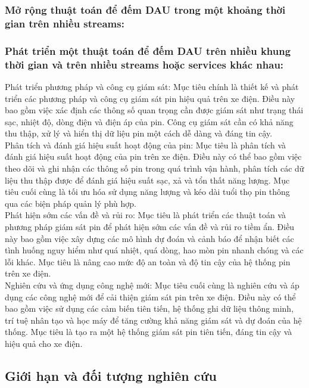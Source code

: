 \documentclass[a4paper,13pt]{article}
\theoremstyle{mytheor}
\begin{document}
\subsubsection{Mở rộng thuật toán để đếm DAU trong một khoảng thời gian trên nhiều streams:}
\subsubsection{Phát triển một thuật toán để đếm DAU trên nhiều khung thời gian và trên nhiều streams hoặc services khác nhau:}
Phát triển phương pháp và công cụ giám sát: Mục tiêu chính là thiết kế và phát triển các phương pháp và công cụ giám sát pin hiệu quả trên xe điện. Điều này bao gồm việc xác định các thông số quan trọng cần được giám sát như trạng thái sạc, nhiệt độ, dòng điện và điện áp của pin. Công cụ giám sát cần có khả năng thu thập, xử lý và hiển thị dữ liệu pin một cách dễ dàng và đáng tin cậy.\\
Phân tích và đánh giá hiệu suất hoạt động của pin: Mục tiêu là phân tích và đánh giá hiệu suất hoạt động của pin trên xe điện. Điều này có thể bao gồm việc theo dõi và ghi nhận các thông số pin trong quá trình vận hành, phân tích các dữ liệu thu thập được để đánh giá hiệu suất sạc, xả và tổn thất năng lượng. Mục tiêu cuối cùng là tối ưu hóa sử dụng năng lượng và kéo dài tuổi thọ pin thông qua các biện pháp quản lý phù hợp.\\
Phát hiện sớm các vấn đề và rủi ro: Mục tiêu là phát triển các thuật toán và phương pháp giám sát pin để phát hiện sớm các vấn đề và rủi ro tiềm ẩn. Điều này bao gồm việc xây dựng các mô hình dự đoán và cảnh báo để nhận biết các tình huống nguy hiểm như quá nhiệt, quá dòng, hao mòn pin nhanh chóng và các lỗi khác. Mục tiêu là nâng cao mức độ an toàn và độ tin cậy của hệ thống pin trên xe điện.\\
Nghiên cứu và ứng dụng công nghệ mới: Mục tiêu cuối cùng là nghiên cứu và áp dụng các công nghệ mới để cải thiện giám sát pin trên xe điện. Điều này có thể bao gồm việc sử dụng các cảm biến tiên tiến, hệ thống ghi dữ liệu thông minh, trí tuệ nhân tạo và học máy để tăng cường khả năng giám sát và dự đoán của hệ thống. Mục tiêu là tạo ra một hệ thống giám sát pin tiên tiến, đáng tin cậy và hiệu quả cho xe điện.

\subsection{Giới hạn và đối tượng nghiên cứu }
\end{document}
